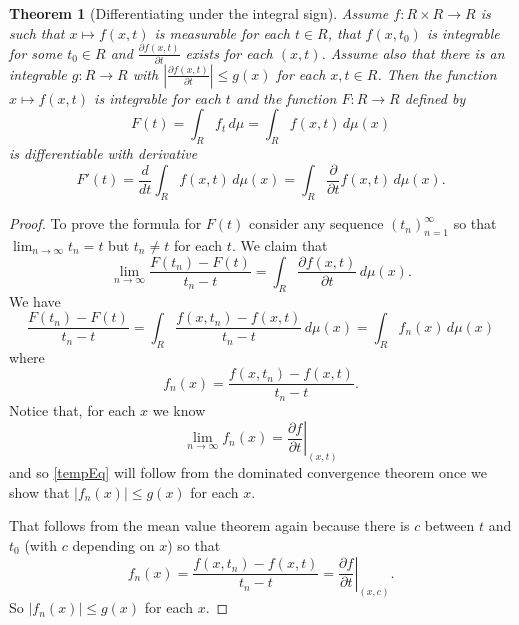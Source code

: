 \documentclass{article}
\newtheorem{theorem}{Theorem}
\theoremstyle{definition}
\begin{document}
\begin{theorem}[Differentiating under the integral sign]
  Assume $f : R \times R \to R$ is such that $x \mapsto f(x, t)$ is measurable
  for each $t \in R$, that $f(x, t_0)$ is integrable for some $t_0 \in R$ and
  $\frac{\partial f(x, t)}{\partial t}$ exists for each $(x, t)$. Assume also
  that there is an integrable $g : R \to R$ with $\left| \frac{\partial f(x,
      t)}{\partial t} \right| \le g(x)$ for each $x, t \in R$. Then the function
  $x \mapsto f(x, t)$ is integrable for each $t$ and the function $F : R \to R$
  defined by
  \[ F(t) = \int_R f_t\,d\mu = \int_R f(x, t)\,d\mu(x) \]
  is differentiable with derivative
  \[ F'(t) = \frac{d}{dt} \int_R f(x, t)\,d\mu(x) = \int_R
    \frac{\partial}{\partial t} f(x, t)\,d\mu(x). \]
\end{theorem}
\begin{proof}
  To prove the formula for $F(t)$ consider any sequence $(t_n)_{n=1}^\infty$ so
  that $\lim_{n \to \infty} t_n = t$ but $t_n \neq t$ for each $t$. We claim
  that
  \begin{equation} \label{tempEq}
    \lim_{n \to \infty} \frac{F(t_n) - F(t)}{t_n - t} = \int_R
    \frac{\partial f(x, t)}{\partial t}\,d\mu(x).
  \end{equation}
  We have
  \[ \frac{F(t_n) - F(t)}{t_n - t} = \int_R \frac{f(x, t_n) - f(x, t)}{t_n -
      t}\,d\mu(x) = \int_R f_n(x)\,d\mu(x) \]
  where
  \[ f_n(x) = \frac{f(x, t_n) - f(x, t)}{t_n - t}. \]
  Notice that, for each $x$ we know
  \[ \lim_{n \to \infty} f_n(x) = \left.\frac{\partial f}{\partial
        t}\right|_{(x, t)} \]
  and so \eqref{tempEq} will follow from the dominated convergence theorem once we show
  that $|f_n(x)| \le g(x)$ for each $x$.

  That follows from the mean value theorem again because there is $c$ between $t$
  and $t_0$ (with $c$ depending on $x$) so that
  \[ f_n(x) = \frac{f(x, t_n) - f(x, t)}{t_n - t} = \left.\frac{\partial
        f}{\partial t}\right|_{(x, c)}. \]
  So $|f_n(x)| \le g(x)$ for each $x$.
\end{proof}
\end{document}
